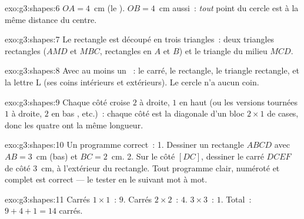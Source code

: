 \begin{solution}{exo:g3:shapes:6}
$OA = 4$~cm (le ). $OB = 4$~cm aussi~: \emph{tout} point du
cercle est à la même distance du centre.
\end{solution}

\begin{solution}{exo:g3:shapes:7}
Le rectangle est découpé en trois triangles~: deux triangles
rectangles ($AMD$ et $MBC$, rectangles en $A$ et $B$) et le triangle
du milieu $MCD$.
\end{solution}

\begin{solution}{exo:g3:shapes:8}
Avec au moins un ~: le carré, le rectangle, le triangle
rectangle, et la lettre L (ses coins intérieurs et extérieurs).
Le cercle n'a aucun coin.
\end{solution}

\begin{solution}{exo:g3:shapes:9}
Chaque côté croise \guillemotleft{} $2$ à droite, $1$ en haut
\guillemotright{} (ou les versions tournées \guillemotleft{} $1$
à droite, $2$ en bas \guillemotright{}, etc.)~: chaque côté est
la diagonale d'un bloc $2 \times 1$ de cases, donc les quatre ont la
même longueur.
\end{solution}

\begin{solution}{exo:g3:shapes:10}
Un programme correct~: \guillemotleft{} 1. Dessiner un rectangle
$ABCD$ avec $AB = 3$~cm (bas) et $BC = 2$~cm. 2. Sur le côté
$[DC]$, dessiner le carré $DCEF$ de côté $3$~cm, à
l'extérieur du rectangle. \guillemotright{} Tout programme clair,
numéroté et complet est correct --- le tester en le suivant mot
à mot.
\end{solution}

\begin{solution}{exo:g3:shapes:11}
Carrés $1 \times 1$~: $9$. Carrés $2 \times 2$~: $4$.
$3 \times 3$~: $1$. Total~: $9 + 4 + 1 = 14$ carrés.
\end{solution}
